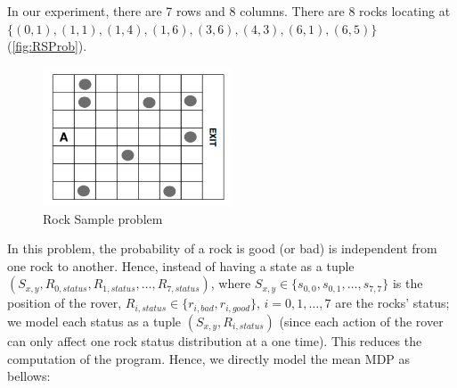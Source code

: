 \documentclass{article}
\begin{document}
In our experiment, there are 7 rows and 8 columns. There are 8 rocks
locating at $\{(0,1), (1,1), (1,4), (1,6), (3,6), (4,3), (6,1), (6,5)\}$
(\autoref{fig:RSProb}).

\begin{figure}[h!]
\centering
\includegraphics[width=0.5\textwidth]{rocksample.png}
\caption{Rock Sample problem}
\label{fig:RSProb}
\end{figure}

In this problem, the probability of a rock is good (or bad) is independent from one
rock to another. Hence, instead of having a state as a tuple 
$(S_{x,y},R_{0,status}, R_{1,status}, \dots, R_{7,status})$, 
where $S_{x,y} \in \{s_{0,0}, s_{0,1}, \dots, s_{7,7}\}$ 
is the position of the rover, $R_{i,status} \in \{r_{i,bad}, r_{i,good}\}$,
$i=0,1,\dots,7$ are the rocks' status; we model each status as a tuple
$(S_{x,y},R_{i,status})$ (since each action of the rover can only
affect one rock status distribution at a one time). This reduces the computation
of the program. Hence, we directly model the mean MDP as bellows:
\end{document}
